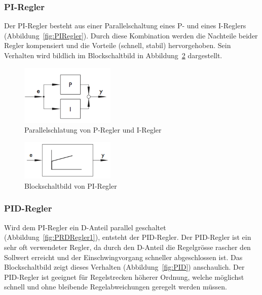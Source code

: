\subsubsection*{PI-Regler}
Der  PI-Regler  besteht  aus  einer   Parallelschaltung  eines  P-  und  eines
I-Reglers   (Abbildung~\ref{fig:PIRegler}). Durch  diese   Kombination  werden
die   Nachteile  beider   Regler  kompensiert   und  die   Vorteile  (schnell,
stabil)  hervorgehoben. Sein Verhalten  wird  bildlich  im Blockschaltbild  in
Abbildung~\ref{fig:PIRegler2} dargestellt.

\begin{figure}[h!, width=\pagewidth]
    \centering
    \includegraphics[width=0.4\textwidth]{images/PIRegler1}
    \caption{Parallelschlatung von P-Regler und I-Regler}
    \label{fig:PIRegler1}
\end{figure}

\begin{figure}[h!, width=\pagewidth]
    \centering
    \includegraphics[width=0.4\textwidth]{images/PIRegler2}
    \caption{Blockschaltbild von PI-Regler}
    \label{fig:PIRegler2}
\end{figure}


\subsubsection*{PID-Regler}

Wird      dem     PI-Regler      ein     D-Anteil      parallel     geschaltet
(Abbildung~\ref{fig:PRDRegler1}),  entsteht   der  PID-Regler. Der  PID-Regler
ist   ein  sehr   oft  verwendeter   Regler,   da  durch   den  D-Anteil   die
Regelgr\"osse  rascher   den  Sollwert  erreicht  und   der  Einschwingvorgang
schneller  abgeschlossen  ist. Das   Blockschaltbild  zeigt  dieses  Verhalten
(Abbildung~\ref{fig:PID})  anschaulich. Der  PID-Regler   ist  geeignet  f\"ur
Regelstrecken h\"oherer Ordnung, welche m\"oglichst schnell und ohne bleibende
Regelabweichungen geregelt werden m\"ussen.

